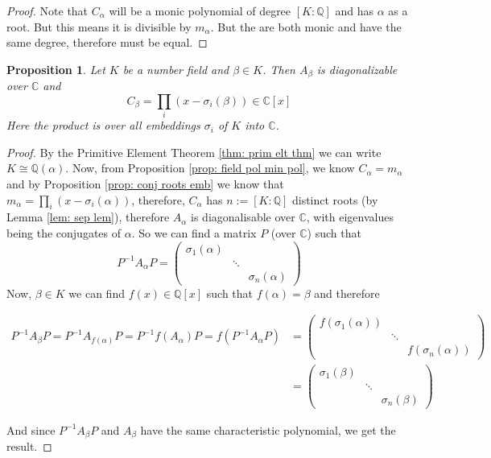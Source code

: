 \documentclass[11pt,a4paper]{report}
\theoremstyle{plain}
\newtheorem{prop}[subsection]{Proposition}
\theoremstyle{definition}
\theoremstyle{definition}
\def\CC{\mathbb{C}}
\def\QQ{\mathbb{Q}}
\def \a{\alpha}
\begin{document}
	\begin{proof}
		Note that $C_\a$ will be a monic polynomial of degree $[K:\QQ]$ and has $\a$ as a root. But this means it is divisible by $m_\a$.  But the are both monic and have the same degree, therefore must be equal.
	\end{proof}
	
	
	
	\begin{prop}\label{prop: field poly embs}
		Let $K$ be a number field and $\beta \in K$. Then $A_\beta$ is diagonalizable over $\CC$ and \[C_\beta=\prod_{i} (x-\sigma_i(\beta)) \in \CC[x] \] Here the product is over all embeddings $\sigma_i$ of $K$ into $\CC$. 
	\end{prop}
	
	\begin{proof}
		By the Primitive Element Theorem \ref{thm: prim elt thm} we can write $K \cong \QQ(\a)$. Now, from Proposition \ref{prop: field pol min pol}, we know $C_\a=m_\a$ and by Proposition \ref{prop: conj roots emb} we know that $m_\a=\prod_{i}(x-\sigma_i(\a))$, therefore, $C_\a$ has $n:=[K:\QQ]$ distinct roots (by Lemma \ref{lem: sep lem}), therefore $A_\a$ is diagonalisable over $\CC$, with eigenvalues being the conjugates of $\a$. So we can find a matrix $P$ (over $\CC$) such that \[P^{-1}A_\a P= \left (\begin{matrix}\sigma_1(\a) && \\ & \ddots & \\ && \sigma_n(\a)
		\end{matrix} \right )\]
		Now, $\beta \in K$ we can find $f(x) \in \QQ[x]$ such that $f(\a)=\beta$ and therefore 
		
		\begin{align*}
			P^{-1} A_\beta P=P^{-1} A_{f(\a)} P= P^{-1} f(A_\a) P=f(P^{-1} A_\a P)&= \left (\begin{matrix}f(\sigma_1(\a)) && \\ & \ddots & \\ && f(\sigma_n(\a))
			\end{matrix} \right )\\&= \left (\begin{matrix}\sigma_1(\beta) && \\ & \ddots & \\ && \sigma_n(\beta)
			\end{matrix} \right ) 
		\end{align*}
		
		And since $P^{-1}A_\beta P$ and $A_\beta$ have the same characteristic polynomial, we get the result.
	\end{proof}
	
\end{document}
